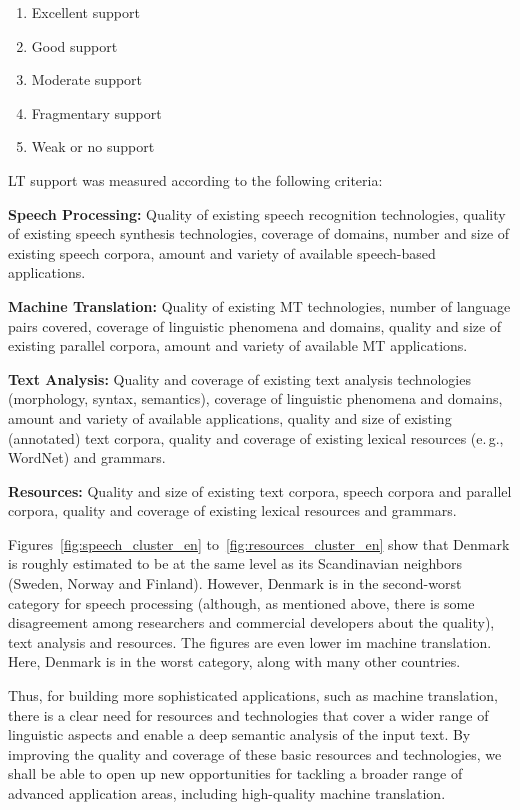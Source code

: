 \documentclass[]{../../metanetpaper}
\begin{document}
\begin{multicols}{2}
\begin{enumerate}
\item Excellent support
\item Good support
\item Moderate support
\item Fragmentary support
\item Weak or no support
\end{enumerate}

LT support was measured according to the following criteria:

\textbf{Speech Processing:} Quality of existing speech recognition technologies, quality of existing speech synthesis technologies, coverage of domains, number and size of existing speech corpora, amount and variety of available speech-based applications.

\textbf{Machine Translation:} Quality of existing MT technologies, number of language pairs covered, coverage of linguistic phenomena and domains, quality and size of existing parallel corpora, amount and variety of available MT applications.

\textbf{Text Analysis:} Quality and coverage of existing text analysis technologies (morphology, syntax, semantics), coverage of linguistic phenomena and domains, amount and variety of available applications, quality and size of existing (annotated) text corpora, quality and coverage of existing lexical resources (e.\,g., WordNet) and grammars.

\textbf{Resources:} Quality and size of existing text corpora, speech corpora and parallel corpora, quality and coverage of existing lexical resources and grammars.

Figures~\ref{fig:speech_cluster_en} to~\ref{fig:resources_cluster_en} show that Denmark is roughly estimated to be at the same level as its Scandinavian neighbors (Sweden, Norway and Finland). However,  Denmark is in the second-worst category for speech processing (although, as mentioned above, there is some disagreement among researchers and commercial developers about the quality), text analysis and resources.
 The figures are even lower im machine translation. Here, Denmark is in the worst category, along with many other countries.

 Thus, for building more sophisticated applications, such as machine translation, there is a clear need for resources and technologies that cover a wider range of linguistic aspects and enable a deep semantic analysis of the input text. By improving the quality and coverage of these basic resources and technologies, we shall be able to open up new opportunities for tackling a broader range of advanced application areas, including high-quality machine translation.


\end{multicols}
\end{document}
